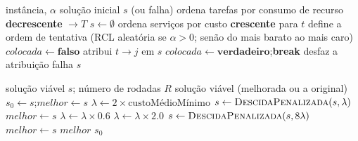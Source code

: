 \documentclass{article}
\begin{document}
\begin{algorithm}[H]
\caption{ConstrutivoBestFit --- Proposta 1}
\begin{algorithmic}[1]
\Require instância, $\alpha$
\Ensure solução inicial $s$ (ou falha)
\State ordena tarefas por consumo de recurso \textbf{decrescente} $\rightarrow T$
\State $s \leftarrow \emptyset$
    \State ordena serviços por custo \textbf{crescente} para $t$
    \State define a ordem de tentativa (RCL aleatória se $\alpha>0$; senão do mais barato ao mais caro)
    \State $colocada \leftarrow \textbf{falso}$
        \State atribui $t \rightarrow j$ em $s$
            \State $colocada \leftarrow \textbf{verdadeiro}$;\quad \textbf{break}
        \Else
            \State desfaz a atribuição
        \EndIf
    \EndFor
        \State \Return falha
    \EndIf
\EndFor
\State \Return $s$
\end{algorithmic}
\end{algorithm}

\begin{algorithm}[H]
\caption{OscilaçãoEstratégica --- Proposta 2}
\begin{algorithmic}[1]
\Require solução viável $s$; número de rodadas $R$
\Ensure solução viável (melhorada ou a original)
\State $s_0 \leftarrow s$;\quad $melhor \leftarrow s$
\State $\lambda \leftarrow 2 \times \text{custoMédioMínimo}$
    \State $s \leftarrow \textsc{DescidaPenalizada}(s, \lambda)$
            \State $melhor \leftarrow s$
        \EndIf
        \State $\lambda \leftarrow \lambda \times 0.6$
    \Else
        \State $\lambda \leftarrow \lambda \times 2.0$
    \EndIf
\EndFor
\State $s \leftarrow \textsc{DescidaPenalizada}(s, 8\lambda)$
    \State $melhor \leftarrow s$
\EndIf
{}
    \State \Return $melhor$
\Else
    \State \Return $s_0$
\EndIf
\end{algorithmic}
\end{algorithm}
\end{document}

